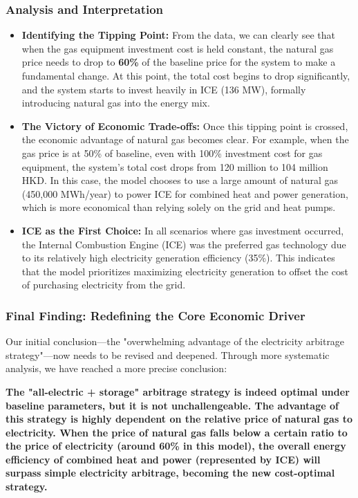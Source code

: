 \documentclass[12pt, a4paper]{article}
\begin{document}
\subsubsection*{Analysis and Interpretation}
\begin{itemize}
    \item \textbf{Identifying the Tipping Point:} From the data, we can clearly see that when the gas equipment investment cost is held constant, the natural gas price needs to drop to \textbf{60\%} of the baseline price for the system to make a fundamental change. At this point, the total cost begins to drop significantly, and the system starts to invest heavily in ICE (136 MW), formally introducing natural gas into the energy mix.
    \item \textbf{The Victory of Economic Trade-offs:} Once this tipping point is crossed, the economic advantage of natural gas becomes clear. For example, when the gas price is at 50\% of baseline, even with 100\% investment cost for gas equipment, the system's total cost drops from 120 million to 104 million HKD. In this case, the model chooses to use a large amount of natural gas (450,000 MWh/year) to power ICE for combined heat and power generation, which is more economical than relying solely on the grid and heat pumps.
    \item \textbf{ICE as the First Choice:} In all scenarios where gas investment occurred, the Internal Combustion Engine (ICE) was the preferred gas technology due to its relatively high electricity generation efficiency (35\%). This indicates that the model prioritizes maximizing electricity generation to offset the cost of purchasing electricity from the grid.
\end{itemize}

\subsubsection*{Final Finding: Redefining the Core Economic Driver}
Our initial conclusion—the "overwhelming advantage of the electricity arbitrage strategy"—now needs to be revised and deepened. Through more systematic analysis, we have reached a more precise conclusion:

\textbf{The "all-electric + storage" arbitrage strategy is indeed optimal under baseline parameters, but it is not unchallengeable. The advantage of this strategy is highly dependent on the relative price of natural gas to electricity. When the price of natural gas falls below a certain ratio to the price of electricity (around 60\% in this model), the overall energy efficiency of combined heat and power (represented by ICE) will surpass simple electricity arbitrage, becoming the new cost-optimal strategy.}
\end{document}
